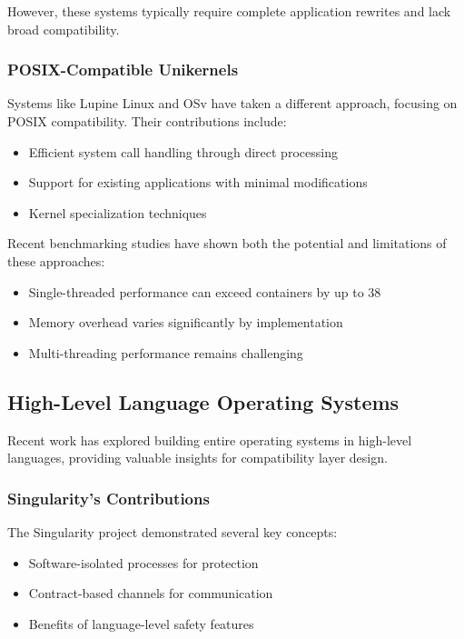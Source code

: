 \documentclass[conference]{IEEEtran}
\begin{document}
However, these systems typically require complete application rewrites and lack broad compatibility.

\subsubsection{POSIX-Compatible Unikernels}
Systems like Lupine Linux \cite{linux_kernel_clothing} and OSv have taken a different approach, focusing on POSIX compatibility. Their contributions include:
\begin{itemize}
	\item Efficient system call handling through direct processing
	\item Support for existing applications with minimal modifications
	\item Kernel specialization techniques
\end{itemize}

Recent benchmarking studies \cite{unikernels_vs_containers} have shown both the potential and limitations of these approaches:
\begin{itemize}
	\item Single-threaded performance can exceed containers by up to 38%
	\item Memory overhead varies significantly by implementation
	\item Multi-threading performance remains challenging
\end{itemize}

\subsection{High-Level Language Operating Systems}
Recent work has explored building entire operating systems in high-level languages, providing valuable insights for compatibility layer design.

\subsubsection{Singularity's Contributions}
The Singularity project \cite{singularity} demonstrated several key concepts:
\begin{itemize}
	\item Software-isolated processes for protection
	\item Contract-based channels for communication
	\item Benefits of language-level safety features
\end{itemize}
\end{document}
